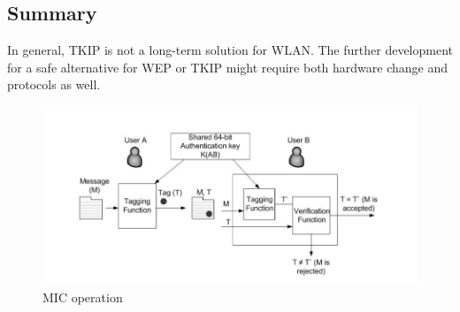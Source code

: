 \subsection{Summary}
In general, \ac{TKIP} is not a long-term solution for \ac{WLAN}. The further development for a safe alternative for \ac{WEP} or \ac{TKIP} might require both hardware change and protocols as well.

\begin{figure}
	\includegraphics[scale=0.4]{images/mic.png}
	\caption{\ac{MIC} operation}
	\label{fig:mic}
\end{figure}
